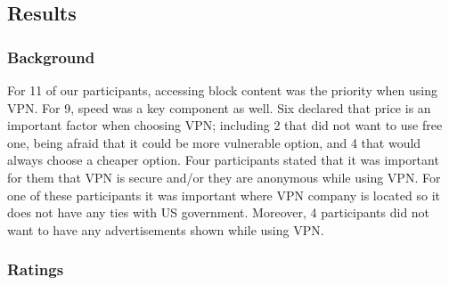 \subsection{Results}\label{sec:results}

\subsubsection{Background}

For 11 of our participants, accessing block content was the priority when
using VPN. For 9, speed was a key component as well. Six declared that price
is an important factor when choosing VPN; including 2 that did not want to use
free one, being afraid that it could be more vulnerable option, and 4 that
would always choose a cheaper option. Four participants stated that it was
important for them that VPN is secure and/or they are anonymous while using
VPN. For one of these participants it was important where VPN company is
located so it does not have any ties with US government.  Moreover, 4
participants did not want to have any advertisements shown while using VPN. 

\subsubsection{Ratings}


